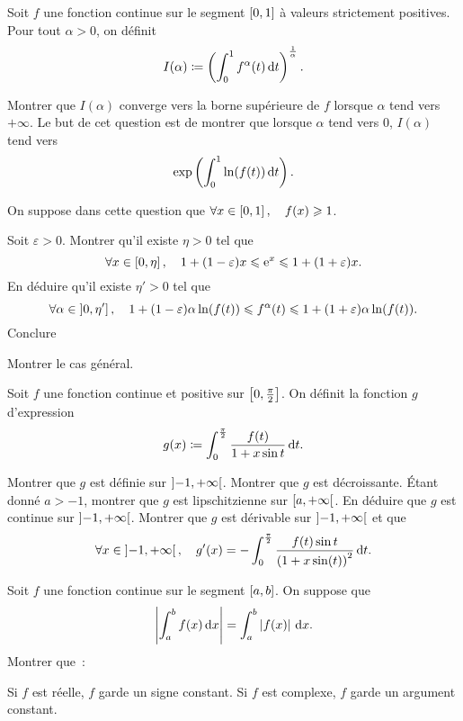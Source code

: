 \documentclass{magnolia}
\begin{document}
Soit $f$ une fonction continue sur le segment $\left[0,1\right]$ à valeurs
strictement positives. Pour tout $\alpha>0$, on définit
$$I(\alpha)\coloneqq \left(\int_{0}^{1} f^\alpha(t)\,\text{d}t\right)^\frac{1}{\alpha}.$$
\begin{questions}
\question Montrer que $I(\alpha)$ converge vers la borne supérieure de
  $f$ lorsque $\alpha$ tend vers $+\infty$.
\question Le but de cet question est de montrer que lorsque $\alpha$ tend vers
  $0$, $I(\alpha)$ tend vers
  \[\exp\left(\int_{0}^{1} \ln(f(t))\,\text{d}t\right).\]
  \begin{questions}
  \question On suppose dans cette question que $\forall x\in\left[0,1\right]
    ,\quad f(x)\geqslant1$.
    \begin{questions}
    \question Soit $\varepsilon>0$. Montrer qu'il existe $\eta>0$ tel que
      $$\forall x\in\left[0,\eta\right] ,\quad 1+(1-\varepsilon)x\leqslant {\rm e}^x
        \leqslant 1+(1+\varepsilon)x.$$
    \question En déduire qu'il existe $\eta'>0$ tel que
      \[\forall \alpha\in\left]0,\eta'\right] ,\quad
        1+(1-\varepsilon)\alpha\ln(f(t)) \leqslant f^{\alpha} (t) \leqslant 
        1+(1+\varepsilon)\alpha\ln(f(t)).\]
    \question Conclure
    \end{questions}
  \question Montrer le cas général.
  \end{questions}
\end{questions}


Soit $f$ une fonction continue et positive sur $\left[0,\frac{\pi}{2}\right]$. On
définit la fonction $g$ d'expression
$$g(x)\coloneqq\int_{0}^{\frac{\pi}{2}} \frac{f(t)}{1+x\sin t}\,\text{d}t.$$
\begin{questions}
\question Montrer que $g$ est définie sur $\left]-1,+\infty\right[$.
\question Montrer que $g$ est décroissante.
\question Étant donné $a>-1$, montrer que $g$ est lipschitzienne sur
  $\left[a,+\infty\right[$. En déduire que $g$ est continue sur
  $\left]-1,+\infty\right[$.
\question Montrer que $g$ est dérivable sur $\left]-1,+\infty\right[$ et que
  \[\forall x\in\left]-1,+\infty\right[ ,\quad
    g'(x)=
    -\int_{0}^{\frac{\pi}{2}} \frac{f(t)\sin t}{\left(1+x\sin(t)\right)^2}\,\text{d}t.\]
\end{questions}

Soit $f$ une fonction continue sur le segment $\left[a,b\right]$. On suppose
que
\[\left|\int_{a}^{b} f(x)\,\text{d}x\right|=\int_{a}^{b} \left|f(x)\right|\,\text{d}x.\]
Montrer que~:
\begin{questions}
\question Si $f$ est réelle, $f$ garde un signe constant.
\question Si $f$ est complexe, $f$ garde un argument constant.
\end{questions}
\end{document}
